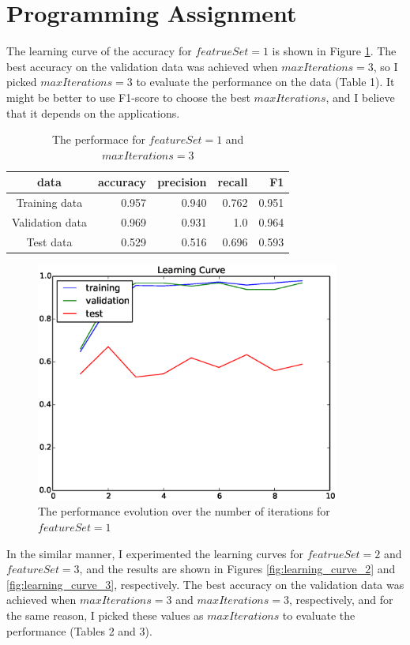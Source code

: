 \section{Programming Assignment}


The learning curve of the accuracy for $featrueSet=1$ is shown in Figure \ref{fig:learning_curve_1}.  The best accuracy on the validation data was achieved when $maxIterations=3$, so I picked $maxIterations = 3$ to evaluate the performance on the data (Table 1). It might be better to use F1-score to choose the best $maxIterations$, and I believe that it depends on the applications.

\begin{table}[htb]
\centering
  \begin{tabular}{|c|r|r|r|r|} \hline
    data & accuracy & precision & recall & F1 \\ \hline
    Training data & 0.957 & 0.940 & 0.762 & 0.951 \\ \hline
    Validation data & 0.969 & 0.931 & 1.0 & 0.964 \\ \hline
    Test data & 0.529 & 0.516 & 0.696 & 0.593 \\ \hline
  \end{tabular}
  \caption{The performace for $featureSet = 1$ and $maxIterations = 3$}
\end{table}

\begin{figure}[hbtp]
\centering
\includegraphics[width=100mm]{learning_curve_1}
\caption{The performance evolution over the number of iterations for $featureSet=1$}
\label{fig:learning_curve_1}
\end{figure}

In the similar manner, I experimented the learning curves for $featrueSet=2$ and $featureSet=3$, and the results are shown in Figures \ref{fig:learning_curve_2} and \ref{fig:learning_curve_3}, respectively. The best accuracy on the validation data was achieved when $maxIterations=3$ and $maxIterations=3$, respectively, and for the same reason, I picked these values as $maxIterations$ to evaluate the performance (Tables 2 and 3).

